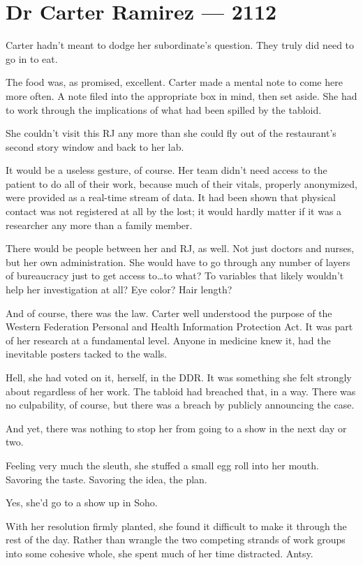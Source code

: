 \hypertarget{dr-carter-ramirez-2112}{%
\chapter*{Dr Carter Ramirez — 2112}\label{dr-carter-ramirez-2112}}

Carter hadn't meant to dodge her subordinate's question. They truly did need to go in to eat.

The food was, as promised, excellent. Carter made a mental note to come here more often. A note filed into the appropriate box in mind, then set aside. She had to work through the implications of what had been spilled by the tabloid.

She couldn't visit this RJ any more than she could fly out of the restaurant's second story window and back to her lab.

It would be a useless gesture, of course. Her team didn't need access to the patient to do all of their work, because much of their vitals, properly anonymized, were provided as a real-time stream of data. It had been shown that physical contact was not registered at all by the lost; it would hardly matter if it was a researcher any more than a family member.

There would be people between her and RJ, as well. Not just doctors and nurses, but her own administration. She would have to go through any number of layers of bureaucracy just to get access to\ldots{}to what? To variables that likely wouldn't help her investigation at all? Eye color? Hair length?

And of course, there was the law. Carter well understood the purpose of the Western Federation Personal and Health Information Protection Act. It was part of her research at a fundamental level. Anyone in medicine knew it, had the inevitable posters tacked to the walls.

Hell, she had voted on it, herself, in the DDR. It was something she felt strongly about regardless of her work. The tabloid had breached that, in a way. There was no culpability, of course, but there was a breach by publicly announcing the case.

And yet, there was nothing to stop her from going to a show in the next day or two.

Feeling very much the sleuth, she stuffed a small egg roll into her mouth. Savoring the taste. Savoring the idea, the plan.

Yes, she'd go to a show up in Soho.

With her resolution firmly planted, she found it difficult to make it through the rest of the day. Rather than wrangle the two competing strands of work groups into some cohesive whole, she spent much of her time distracted. Antsy.

